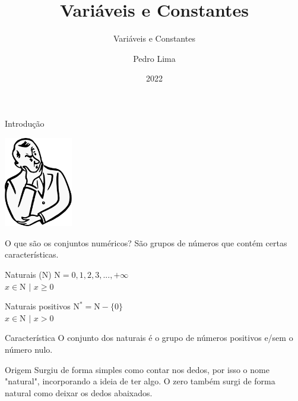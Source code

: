 \documentclass{beamer}
\title{Variáveis e Constantes}
\subtitle{Variáveis e Constantes}
\author{Pedro Lima}
\institute{PLmatemática}
\date{2022}
\begin{document}
    \maketitle
    
    \begin{frame}{Introdução}
        \begin{center}
            \includegraphics[width=3cm]{imagens/images.png}
        \end{center}
        \begin{block}{O que são os conjuntos numéricos?}
            São grupos de números que contém certas características.
        \end{block}
    \end{frame}
    
    \begin{frame}{Naturais ($\mathrm{N}$)}
        $\mathrm{N} = 0, 1, 2, 3, ... , +\infty$\\
        $x \in \mathrm{N}$ $|$ $x \ge 0$\\
        \begin{alertblock}{Naturais positivos}
            $\mathrm{N}^* = \mathrm{N} - \{0\}$\\
            $x \in \mathrm{N}$ $|$ $x > 0$
        \end{alertblock}
        \begin{block}{Característica}
            O conjunto dos naturais é o grupo de números positivos e/sem o número nulo.
        \end{block}
        \begin{block}{Origem}
            Surgiu de forma simples como contar nos dedos, por isso o nome "natural", incorporando a ideia de ter algo. O zero também surgi de forma natural como deixar os dedos abaixados.
        \end{block}
    \end{frame}
    
\end{document}
